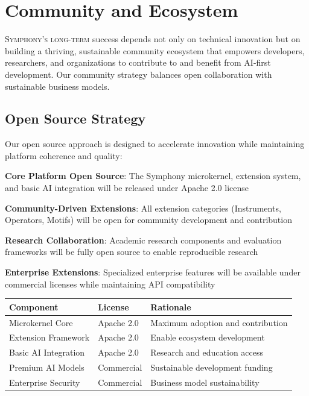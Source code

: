 
\section*{Community and Ecosystem}

\lettrine{S}{ymphony's long-term} success depends not only on technical innovation but on building a thriving, sustainable community ecosystem that empowers developers, researchers, and organizations to contribute to and benefit from AI-first development. Our community strategy balances open collaboration with sustainable business models.

\subsection*{Open Source Strategy}

Our open source approach is designed to accelerate innovation while maintaining platform coherence and quality:

\begin{expandedlist}
    \item \textbf{Core Platform Open Source}: The Symphony microkernel, extension system, and basic AI integration will be released under Apache 2.0 license
    \item \textbf{Community-Driven Extensions}: All extension categories (Instruments, Operators, Motifs) will be open for community development and contribution
    \item \textbf{Research Collaboration}: Academic research components and evaluation frameworks will be fully open source to enable reproducible research
    \item \textbf{Enterprise Extensions}: Specialized enterprise features will be available under commercial licenses while maintaining API compatibility
\end{expandedlist}

\begin{center}
\begin{tabular}{@{}lll@{}}
\toprule
\textbf{Component} & \textbf{License} & \textbf{Rationale} \\
\midrule
Microkernel Core & Apache 2.0 & Maximum adoption and contribution \\
Extension Framework & Apache 2.0 & Enable ecosystem development \\
Basic AI Integration & Apache 2.0 & Research and education access \\
Premium AI Models & Commercial & Sustainable development funding \\
Enterprise Security & Commercial & Business model sustainability \\
\bottomrule
\end{tabular}
\end{center}

